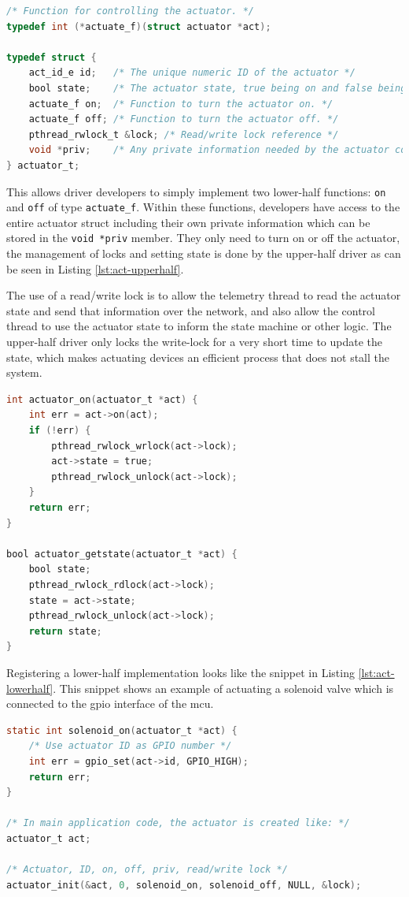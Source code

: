 \begin{lstlisting}[caption={Actuator type definitions}, label={lst:act-interface}, language={C}]
/* Function for controlling the actuator. */
typedef int (*actuate_f)(struct actuator *act);

typedef struct {
    act_id_e id;   /* The unique numeric ID of the actuator */
    bool state;    /* The actuator state, true being on and false being off*/
    actuate_f on;  /* Function to turn the actuator on. */
    actuate_f off; /* Function to turn the actuator off. */
    pthread_rwlock_t &lock; /* Read/write lock reference */
    void *priv;    /* Any private information needed by the actuator control functions */
} actuator_t;
\end{lstlisting}

This allows driver developers to simply implement two lower-half functions: \texttt{on} and \texttt{off} of type
\texttt{actuate\_f}. Within these functions, developers have access to the entire actuator struct including their own
private information which can be stored in the \texttt{void *priv} member. They only need to turn on or off the
actuator, the management of locks and setting state is done by the upper-half driver as can be seen in Listing
\ref{lst:act-upperhalf}.

The use of a read/write lock is to allow the telemetry thread to read the actuator state and send that information over
the network, and also allow the control thread to use the actuator state to inform the state machine or other logic.
The upper-half driver only locks the write-lock for a very short time to update the state, which makes actuating
devices an efficient process that does not stall the system.

\begin{lstlisting}[caption={Actuator upper-half implementation example}, label={lst:act-upperhalf}, language={C}]
int actuator_on(actuator_t *act) {
    int err = act->on(act);
    if (!err) {
        pthread_rwlock_wrlock(act->lock);
        act->state = true;
        pthread_rwlock_unlock(act->lock);
    }
    return err;
}

bool actuator_getstate(actuator_t *act) {
    bool state;
    pthread_rwlock_rdlock(act->lock);
    state = act->state;
    pthread_rwlock_unlock(act->lock);
    return state;
}
\end{lstlisting}

Registering a lower-half implementation looks like the snippet in Listing \ref{lst:act-lowerhalf}. This snippet shows
an example of actuating a solenoid valve which is connected to the \gls{gpio} interface of the \gls{mcu}.

\begin{lstlisting}[caption={Actuator lower-half implementation example}, label={lst:act-lowerhalf}, language={C}]
static int solenoid_on(actuator_t *act) {
    /* Use actuator ID as GPIO number */
    int err = gpio_set(act->id, GPIO_HIGH);
    return err;
}

/* In main application code, the actuator is created like: */
actuator_t act;

/* Actuator, ID, on, off, priv, read/write lock */
actuator_init(&act, 0, solenoid_on, solenoid_off, NULL, &lock);
\end{lstlisting}
